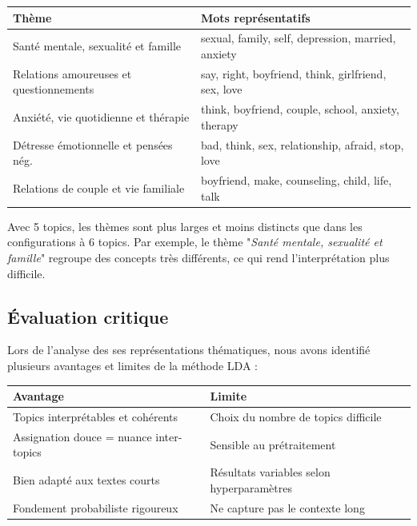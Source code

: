\documentclass[12pt,a4paper]{report}
\begin{document}
\begin{center}
\begin{tabular}{@{}ll@{}}
\toprule
\textbf{Thème} & \textbf{Mots représentatifs} \\
\midrule
Santé mentale, sexualité et famille     & sexual, family, self, depression, married, anxiety \\
Relations amoureuses et questionnements & say, right, boyfriend, think, girlfriend, sex, love \\
Anxiété, vie quotidienne et thérapie    & think, boyfriend, couple, school, anxiety, therapy \\
Détresse émotionnelle et pensées nég.   & bad, think, sex, relationship, afraid, stop, love \\
Relations de couple et vie familiale    & boyfriend, make, counseling, child, life, talk \\
\bottomrule
\end{tabular}
\end{center}

\begin{note}[Interprétation]
Avec 5 topics, les thèmes sont plus larges et moins distincts que dans les configurations à 6 topics. Par exemple, le thème "\textit{Santé mentale, sexualité et famille}" 
regroupe des concepts très différents, ce qui rend l'interprétation plus difficile.
\end{note}

\subsection{Évaluation critique}
Lors de l'analyse des ses représentations thématiques, nous avons identifié plusieurs avantages et limites de la méthode LDA :

\begin{center}
\begin{tabular}{@{}ll@{}}
\toprule
\textbf{Avantage} & \textbf{Limite} \\
\midrule
Topics interprétables et cohérents       & Choix du nombre de topics difficile \\
Assignation douce = nuance inter-topics  & Sensible au prétraitement \\
Bien adapté aux textes courts            & Résultats variables selon hyperparamètres \\
Fondement probabiliste rigoureux         & Ne capture pas le contexte long \\
\bottomrule
\end{tabular}
\end{center}
\end{document}
